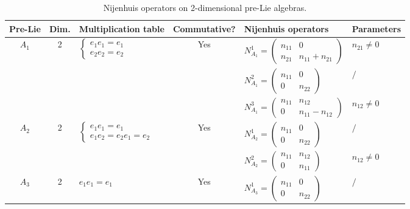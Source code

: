 \documentclass[12pt, reqno]{amsart}
\theoremstyle{plain}
\begin{document}
\begin{table}[htbp]
    \centering
    \tiny
    \caption{Nijenhuis operators on 2-dimensional pre-Lie algebras.}
    \begin{tabular}{|c|c|>{\raggedright\arraybackslash}m{3cm}|c|l|l|}
        \hline
        \textbf{Pre-Lie} & \textbf{Dim.} & \textbf{Multiplication table} & \textbf{Commutative?} & \textbf{Nijenhuis operators} & \textbf{Parameters} \\
        \hline
        $A_1$ & 2 & $\begin{cases} e_1e_1=e_1 \\ e_2e_2=e_2 \end{cases}$ & Yes & 
        $N_{A_1}^1=\begin{pmatrix} n_{11} & 0 \\ n_{21} & n_{11}+n_{21} \end{pmatrix}$ & $n_{21}\neq0$ \\
        & & & & $N_{A_1}^2=\begin{pmatrix} n_{11} & 0 \\ 0 & n_{22} \end{pmatrix}$ & $/$ \\
        & & & & $N_{A_1}^3=\begin{pmatrix} n_{11} & n_{12} \\ 0 & n_{11}-n_{12} \end{pmatrix}$ & $n_{12}\neq0$ \\
        \hline
        $A_2$ & 2 & $\begin{cases}e_1e_1=e_1\\ e_1e_2=e_2e_1=e_2\end{cases}$ & Yes & 
        $N_{A_2}^1=\begin{pmatrix} n_{11} & 0 \\ 0 & n_{22} \end{pmatrix}$ & $/$ \\
        & & & & $N_{A_2}^2=\begin{pmatrix} n_{11} & n_{12} \\ 0 & n_{11} \end{pmatrix}$ & $n_{12}\neq0$ \\
        \hline
        $A_3$ & 2 & $ e_1e_1=e_1 $ & Yes & 
        $N_{A_3}^1=\begin{pmatrix} n_{11} & 0 \\ 0 & n_{22} \end{pmatrix}$ & $/$ \\

\end{tabular}
\end{table}
\end{document}
